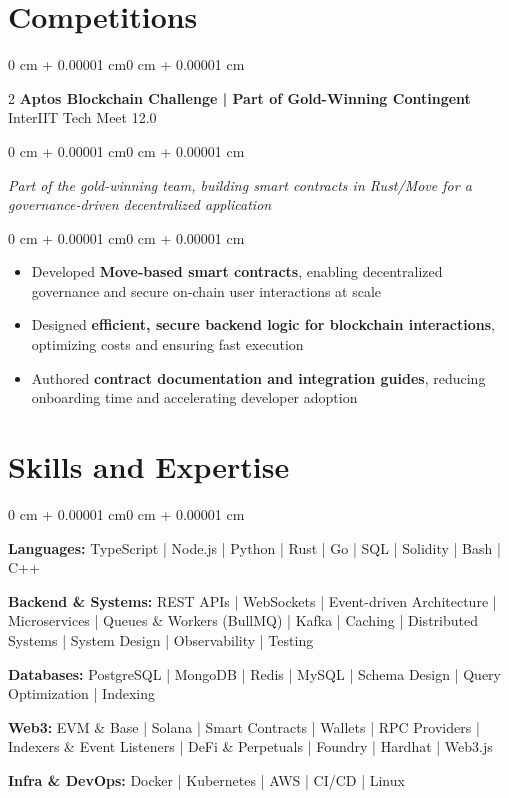 \documentclass[10pt, letterpaper]{article}
\newenvironment{highlights}{
    \begin{itemize}[
        topsep=0.05 cm,
        parsep=0.05 cm,
        partopsep=0pt,
        itemsep=-1pt,
        leftmargin=0 cm + 10pt
    ]
}{
    \end{itemize}
}
\newenvironment{onecolentry}{
    \begin{adjustwidth}{0 cm + 0.00001 cm}{0 cm + 0.00001 cm}
}{
    \end{adjustwidth}
}
\newenvironment{twocolentry2}[2][]{
    \onecolentry
    \def\secondColumn{#2}
    \setcolumnwidth{\fill, 3.5 cm}
    \begin{paracol}{2}
}{
    \switchcolumn \raggedleft \secondColumn
    \end{paracol}
    \endonecolentry
}
\begin{document}
{\section{Competitions}

\begin{twocolentry2}{
    InterIIT Tech Meet 12.0
} \textbf{Aptos Blockchain Challenge | Part of Gold-Winning Contingent} \end{twocolentry2}
\begin{onecolentry}
     \textit{Part of the gold-winning team, building smart contracts in Rust/Move for a governance-driven decentralized application}
\end{onecolentry}
\vspace{0.10 cm}
\begin{onecolentry}
    \begin{highlights}
  \item Developed \textbf{Move-based smart contracts}, enabling decentralized governance and secure on-chain user interactions at scale
     \item Designed \textbf{efficient, secure backend logic for blockchain interactions}, optimizing costs and ensuring fast execution
  \item Authored \textbf{contract documentation and integration guides}, reducing onboarding time and accelerating developer adoption
    \end{highlights}
\end{onecolentry}


    \section{Skills and Expertise}

        \begin{onecolentry}

\textbf{Languages:} TypeScript | Node.js | Python | Rust | Go | SQL | Solidity | Bash | C++

\textbf{Backend \& Systems:} REST APIs | WebSockets | Event-driven Architecture | Microservices | Queues \& Workers (BullMQ) | Kafka | Caching | Distributed Systems | System Design | Observability | Testing

\textbf{Databases:} PostgreSQL | MongoDB | Redis | MySQL | Schema Design | Query Optimization | Indexing

\textbf{Web3:} EVM \& Base | Solana | Smart Contracts | Wallets | RPC Providers | Indexers \& Event Listeners | DeFi \& Perpetuals | Foundry | Hardhat | Web3.js

\textbf{Infra \& DevOps:} Docker | Kubernetes | AWS | CI/CD | Linux

        \end{onecolentry}
\end{document}
